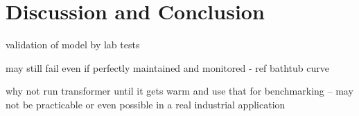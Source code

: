 \documentclass[]{article}
\begin{document}

\section{Discussion and Conclusion} \label{sec:conclusion}


validation of model by lab tests

may still fail even if perfectly maintained and monitored - ref bathtub curve

why not run transformer until it gets warm and use that for benchmarking -- may not be practicable or even possible in a real industrial application

\clearpage
\vspace{5mm}



\end{document}
